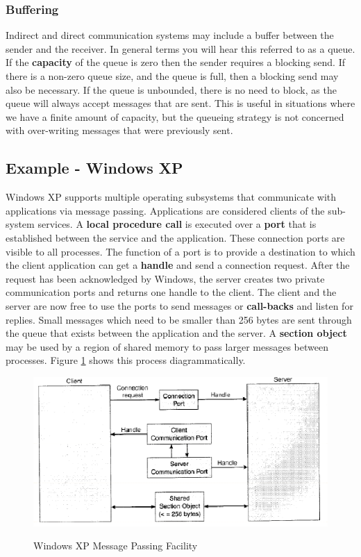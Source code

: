 \documentclass[10pt,a4paper]{article}
\begin{document}
\subsubsection{Buffering}
Indirect and direct communication systems may include a buffer between the sender and the receiver. In general terms you will hear this referred to as a queue. If the {\bf capacity} of the queue is zero then the sender requires a blocking send. If there is a non-zero queue size, and the queue is full, then a blocking send may also be necessary. If the queue is unbounded, there is no need to block, as the queue will always accept messages that are sent. This is useful in situations where we have a finite amount of capacity, but the queueing strategy is not concerned with over-writing messages that were previously sent. 
\subsection{Example - Windows XP}
Windows XP supports multiple operating subsystems that communicate with applications via message passing. Applications are considered clients of the sub-system services. A {\bf local procedure call} is executed over a {\bf port} that is established between the service and the application. These connection ports are visible to all processes. The function of a port is to provide a destination to which the client application can get a {\bf handle} and send a connection request. After the request has been acknowledged by Windows, the server creates two private communication ports and returns one handle to the client. The client and the server are now free to use the ports to send messages or {\bf call-backs} and listen for replies. Small messages which need to be smaller than 256 bytes are sent through the queue that exists between the application and the server. A {\bf section object} may be used by a region of shared memory to pass larger messages between processes. Figure \ref{winxpmsg} shows this process diagrammatically. 
\begin{figure}
\caption{Windows XP Message Passing Facility \cite{OSCONCEPTS}}
\begin{center}
\includegraphics[scale=0.45]{../images/windows-xp-message-passing.png}
\label{winxpmsg}
\end{center}
\end{figure}
\end{document}
